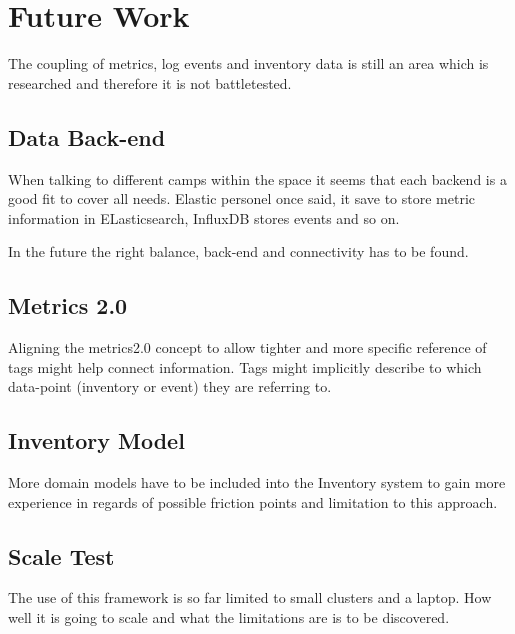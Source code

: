\section{Future Work}

The coupling of metrics, log events and inventory data is still an area which is researched and therefore it is not battletested.

\subsection{Data Back-end}
When talking to different camps within the space it seems that each backend is a good fit to cover all needs.
Elastic personel once said, it save to store metric information in ELasticsearch, InfluxDB stores events and so on.

In the future the right balance, back-end and connectivity has to be found.

\subsection{Metrics 2.0}
Aligning the metrics2.0 concept to allow tighter and more specific reference of tags might help connect information.
Tags might implicitly describe to which data-point (inventory or event) they are referring to.

\subsection{Inventory Model}
More domain models have to be included into the Inventory system to gain more experience in regards of possible friction points and limitation to this approach.

\subsection{Scale Test}
The use of this framework is so far limited to small clusters and a laptop. How well it is going to scale and what the limitations are is to be discovered.